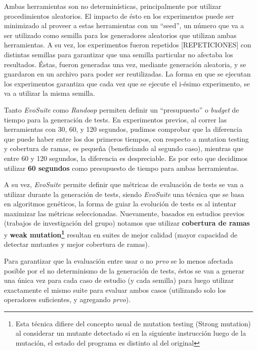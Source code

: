 Ambas herramientas son no determin\'isticas, principalmente por utilizar procedimientos aleatorios. El impacto de \'esto en los experimentos puede ser minimizado al proveer a estas herramientas con un ``seed'', un n\'umero que va a ser utilizado como semilla para los generadores aleatorios que utilizan ambas herramientas. A su vez, los experimentos fueron repetidos [REPETICIONES] con distintas semillas para garantizar que una semilla particular no afectaba los resultados. \'Estas, fueron generadas una vez, mediante generaci\'on aleatoria, y se guardaron en un archivo para poder ser reutilizadas. La forma en que se ejecutan los experimentos garantiza que cada vez que se ejecute el i-\'esimo experimento, se va a utilizar la misma semilla.

Tanto \emph{EvoSuite} como \emph{Randoop} permiten definir un ``presupuesto'' o \emph{budget} de tiempo para la generaci\'on de tests. En experimentos previos, al correr las herramientas con 30, 60, y 120 segundos, pudimos comprobar que la diferencia que puede haber entre los dos primeros tiempos, con respecto a mutation testing y cobertura de ramas, es peque\~na (beneficiando al segundo caso), mientras que entre 60 y 120 segundos, la diferencia es despreciable. Es por esto que decidimos utilizar \textbf{60 segundos} como presupuesto de tiempo para ambas herramientas.

A su vez, \emph{EvoSuite} permite definir que m\'etricas de evaluaci\'on de tests se van a utilizar durante la generaci\'on de tests, siendo \emph{EvoSuite} una t\'ecnica que se basa en algoritmos gen\'eticos, la forma de guiar la evoluci\'on de tests es al intentar maximizar las m\'etricas seleccionadas. Nuevamente, basados en estudios previos (trabajos de investigaci\'on del grupo) notamos que utilizar \textbf{cobertura de ramas} y \textbf{weak mutation\footnote{Esta t\'ecnica difiere del concepto usual de mutation testing (Strong mutation) al considerar un mutante detectado si en la siguiente instrucci\'on luego de la mutaci\'on, el estado del programa es distinto al del original}} resultan en suites de mejor calidad (mayor capacidad de detectar mutantes y mejor cobertura de ramas).

Para garantizar que la evaluaci\'on entre usar o no \emph{prvo} se lo menos afectada posible por el no determinismo de la generaci\'on de tests, \'estos se van a generar una \'unica vez para cada caso de estudio (y cada semilla) para luego utilizar exactamente el mismo suite para evaluar ambos casos (utilizando solo los operadores suficientes, y agregando \emph{prvo}).

